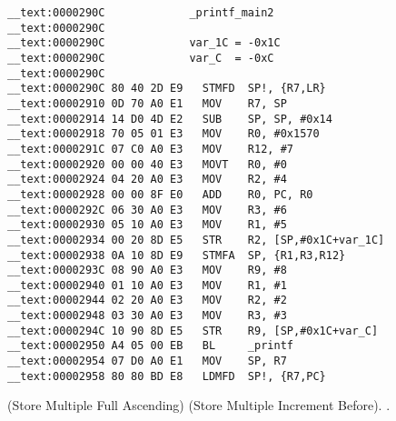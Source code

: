 \begin{lstlisting}
__text:0000290C             _printf_main2
__text:0000290C
__text:0000290C             var_1C = -0x1C
__text:0000290C             var_C  = -0xC
__text:0000290C
__text:0000290C 80 40 2D E9   STMFD  SP!, {R7,LR}
__text:00002910 0D 70 A0 E1   MOV    R7, SP
__text:00002914 14 D0 4D E2   SUB    SP, SP, #0x14
__text:00002918 70 05 01 E3   MOV    R0, #0x1570
__text:0000291C 07 C0 A0 E3   MOV    R12, #7
__text:00002920 00 00 40 E3   MOVT   R0, #0
__text:00002924 04 20 A0 E3   MOV    R2, #4
__text:00002928 00 00 8F E0   ADD    R0, PC, R0
__text:0000292C 06 30 A0 E3   MOV    R3, #6
__text:00002930 05 10 A0 E3   MOV    R1, #5
__text:00002934 00 20 8D E5   STR    R2, [SP,#0x1C+var_1C]
__text:00002938 0A 10 8D E9   STMFA  SP, {R1,R3,R12}
__text:0000293C 08 90 A0 E3   MOV    R9, #8
__text:00002940 01 10 A0 E3   MOV    R1, #1
__text:00002944 02 20 A0 E3   MOV    R2, #2
__text:00002948 03 30 A0 E3   MOV    R3, #3
__text:0000294C 10 90 8D E5   STR    R9, [SP,#0x1C+var_C]
__text:00002950 A4 05 00 EB   BL     _printf
__text:00002954 07 D0 A0 E1   MOV    SP, R7
__text:00002958 80 80 BD E8   LDMFD  SP!, {R7,PC}
\end{lstlisting}

%
  (Store Multiple Full Ascending)%
%
 (Store Multiple Increment Before). 
.

